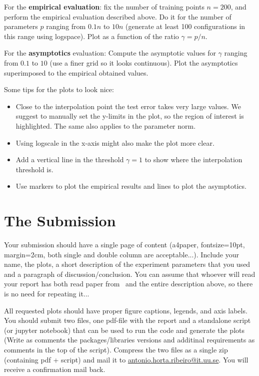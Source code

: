 \documentclass[a4paper,10pt]{article}
\newenvironment{note}
{
\begin{center}
\begin{lrbox}{\mybox}
\begin{minipage}{42em}}
{\end{minipage}
\end{lrbox}\fbox{\usebox{\mybox}}
\end{center}}
\begin{document}
For the \textbf{empirical evaluation}: fix the number of training points $n = 200$, and perform the empirical evaluation described above. Do it for the number of parameters $p$ ranging from $0.1n$ to $10 n$ (generate at least 100 configurations in this range using logspace). Plot as a function of the ratio $\gamma = p / n$.

For the \textbf{asymptotics} evaluation: Compute the asymptotic values for $\gamma$ ranging from $0.1$ to $10$ (use a finer grid so it looks continuous). Plot the asymptotics superimposed to the empirical obtained values.

   \begin{note}
    Some tips for the plots to look nice:
    \begin{itemize}
        \item Close to the interpolation point the test error takes very
        large values. We suggest to manually set the y-limits in the plot, so the region of interest is highlighted. The same also applies to the parameter norm.
        \item Using logscale in the x-axis might also make the plot more clear.
        \item Add a vertical line in the threshold $\gamma = 1$ to show where the interpolation threshold is.
        \item Use markers to plot the empirical results and lines to plot the asymptotics.
    \end{itemize}
    \end{note}

\section*{The Submission}
Your submission should have a single page of content (a4paper, fontsize=10pt, margin=2cm, both single and double column are acceptable...).  Include your name, the plots, a short description of the experiment parameters that you used and a paragraph of discussion/conclusion. You can assume that whoever will read your report has both read paper from~\citep{hastie_surprises_2019} and the entire description above, so there is no need for repeating it... 

All requested plots should have proper figure captions, legends, and axis labels. You should submit two files, one pdf-file with the report and a standalone script (or jupyter notebook) that can be used to run the code and generate the plots (Write as comments the packages/libraries versions and additinal requirements as comments in the top of the script). Compress the two files as a single zip (containing pdf + script) and mail it to \href{mailto:antonio.horta.ribeiro@it.uu.se}{antonio.horta.ribeiro@it.uu.se}. You will receive a confirmation mail back.
\end{document}
